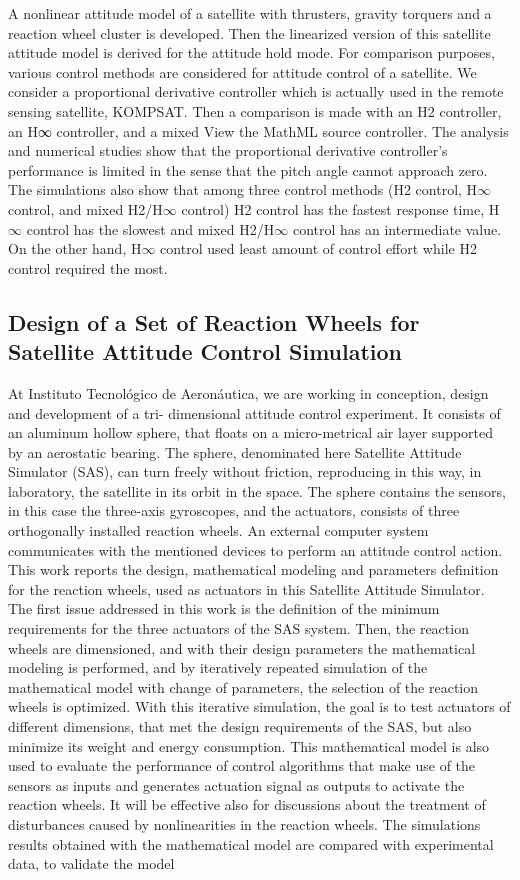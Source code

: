 A nonlinear attitude model of a satellite with thrusters, gravity torquers and a reaction wheel cluster is developed. Then the linearized version of this satellite attitude model is derived for the attitude hold mode. For comparison purposes, various control methods are considered for attitude control of a satellite. We consider a proportional derivative controller which is actually used in the remote sensing satellite, KOMPSAT. Then a comparison is made with an H2 controller, an H∞ controller, and a mixed View the MathML source controller. The analysis and numerical studies show that the proportional derivative controller's performance is limited in the sense that the pitch angle cannot approach zero. The simulations also show that among three control methods (H2 control, H$\infty$ control, and mixed H2/H$\infty$ control) H2 control has the fastest response time, H$\infty$ control has the slowest and mixed H2/H$\infty$ control has an intermediate value. On the other hand, H$\infty$ control used least amount of control effort while H2 control required the most.


\subsection{Design
of
a Set of Reaction Wheels for Satellite Attitude Control Simulation}

At
Instituto
Tecnológico de Aeronáutica, we are working in conception, design and development of a tri-
dimensional attitude control experiment. It consists of an aluminum hollow sphere, that floats on a micro-metrical air
layer supported by an aerostatic bearing. The sphere, denominated here Satellite Attitude Simulator (SAS), can turn
freely without friction, reproducing in this way, in laboratory, the satellite in its orbit in the space. The sphere contains
the sensors, in this case the three-axis gyroscopes, and the actuators, consists of three orthogonally installed reaction
wheels. An external computer system communicates with the mentioned devices to perform an attitude control action.
This work reports the design, mathematical modeling and parameters definition for the reaction wheels, used as actuators
in this Satellite Attitude Simulator. The first issue addressed in this work is the definition of the minimum requirements for
the three actuators of the SAS system. Then, the reaction wheels are dimensioned, and with their design parameters the
mathematical modeling is performed, and by iteratively repeated simulation of the mathematical model with change of
parameters, the selection of the reaction wheels is optimized. With this iterative simulation, the goal is to test actuators of
different dimensions, that met the design requirements of the SAS, but also minimize its weight and energy consumption.
This mathematical model is also used to evaluate the performance of control algorithms that make use of the sensors as
inputs and generates actuation signal as outputs to activate the reaction wheels. It will be effective also for discussions
about the treatment of disturbances caused by nonlinearities in the reaction wheels. The simulations results obtained with
the mathematical model are compared with experimental data, to validate the model


